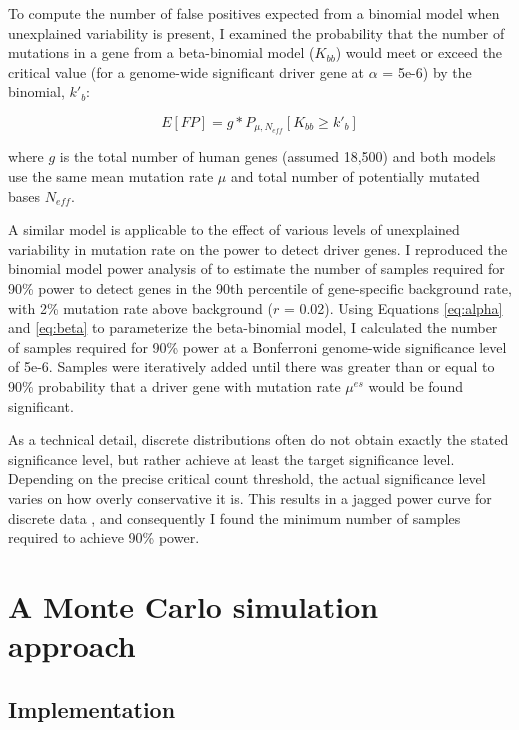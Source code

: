 To compute the number of false positives expected from a binomial model when unexplained variability is present, I examined the probability that the number of mutations in a gene from a beta-binomial model ($K_{bb}$) would meet or exceed the critical value (for a genome-wide significant driver gene at $\alpha$ = 5e-6) by the binomial, $k'_b$:

\begin{equation}
E[FP] = g*P_{\mu,N_{eff}}[K_{bb}\geq k'_b]
\end{equation}

where $g$ is the total number of human genes (assumed 18,500) and both models use the same mean mutation rate $\mu$ and total number of potentially mutated bases $N_{eff}$.

A similar model is applicable to the effect of various levels of unexplained variability in mutation rate on the power to detect driver genes. I reproduced the binomial model power analysis of \cite{RN14} to estimate the number of samples required for 90\% power to detect genes in the 90th percentile of gene-specific background rate, with 2\% mutation rate above background ($r$ = 0.02). Using Equations \ref{eq:alpha} and \ref{eq:beta} to parameterize the beta-binomial model, I calculated the number of samples required for 90\% power at a Bonferroni genome-wide significance level of 5e-6. Samples were iteratively added until there was greater than or equal to 90\% probability that a driver gene with mutation rate $\mu^{es}$ would be found significant. 

As a technical detail, discrete distributions often do not obtain exactly the stated significance level, but rather achieve at least the target significance level. Depending on the precise critical count threshold, the actual significance level varies on how overly conservative it is. This results in a jagged power curve for discrete data \cite{RN75}, and consequently I found the minimum number of samples required to achieve 90\% power.

\section{A Monte Carlo simulation approach}
\label{sec:monte_carlo}

\subsection{Implementation}

